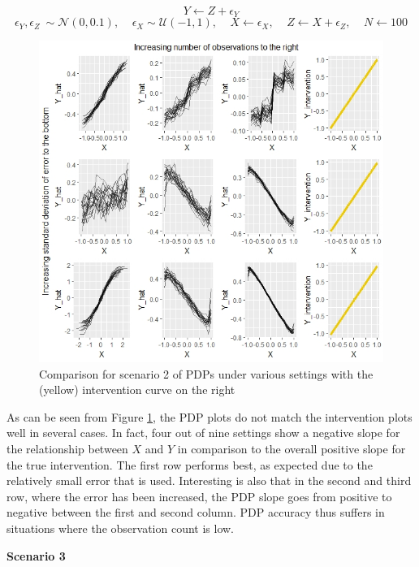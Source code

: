 \documentclass[
]{krantz}
\begin{document}
\[ Y \leftarrow Z + \epsilon_Y  \]
\[ \epsilon_Y,\epsilon_Z ~ \sim \mathcal{N}(0, 0.1), \ \ \ \ \ \epsilon_X \sim \mathcal{U}(-1,1), \ \ \ \ \ X \leftarrow \epsilon_X, \ \ \ \ \ Z \leftarrow X + \epsilon_Z, \ \ \ \ \ N \leftarrow 100 \]

\begin{figure}

\includegraphics[width=1\linewidth]{images/scenario2_all} \hfill{}

\caption{Comparison for scenario 2 of PDPs under various settings with the (yellow) intervention curve on the right}\label{fig:Figure6}
\end{figure}

As can be seen from Figure \ref{fig:Figure6}, the PDP plots do not match the intervention plots well in several cases. In fact, four out of nine settings show a negative slope for the relationship between \(X\) and \(Y\) in comparison to the overall positive slope for the true intervention. The first row performs best, as expected due to the relatively small error that is used. Interesting is also that in the second and third row, where the error has been increased, the PDP slope goes from positive to negative between the first and second column. PDP accuracy thus suffers in situations where the observation count is low.

\textbf{Scenario 3}
\end{document}
